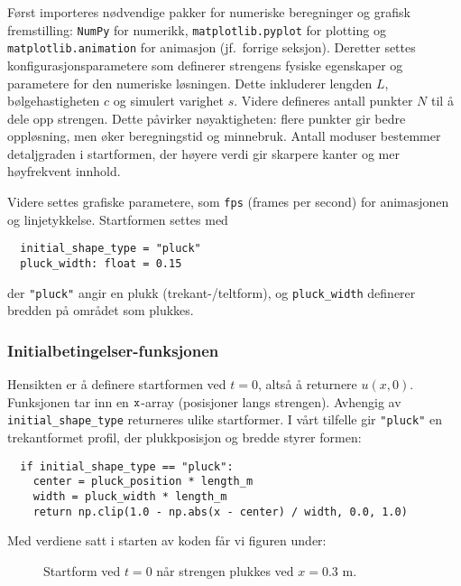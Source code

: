 Først importeres nødvendige pakker for numeriske beregninger og grafisk fremstilling: \texttt{NumPy} for numerikk,
\texttt{matplotlib.pyplot} for plotting og \texttt{matplotlib.animation} for animasjon (jf.\ forrige seksjon).
Deretter settes konfigurasjonsparametere som definerer strengens fysiske egenskaper og parametere for den numeriske 
løsningen. Dette inkluderer lengden $L$, bølgehastigheten $c$ og simulert varighet $s$. Videre defineres antall
punkter $N$ til å dele opp strengen. Dette påvirker nøyaktigheten: flere punkter gir bedre oppløsning, men øker
beregningstid og minnebruk. Antall moduser bestemmer detaljgraden i startformen, der høyere verdi gir skarpere kanter og
mer høyfrekvent innhold. 

Videre settes grafiske parametere, som \texttt{fps} (frames per second) for animasjonen og linjetykkelse. Startformen 
settes med
\begin{lstlisting}
  initial_shape_type = "pluck"
  pluck_width: float = 0.15
\end{lstlisting}
der \verb|"pluck"| angir en plukk (trekant-/teltform), og \verb|pluck_width| definerer bredden på området som plukkes.

\subsubsection{Initialbetingelser-funksjonen}
Hensikten er å definere startformen ved $t=0$, altså å returnere $u(x,0)$.
Funksjonen tar inn en $\verb|x|$-array (posisjoner langs strengen). Avhengig av \verb|initial_shape_type|
returneres ulike startformer. I vårt tilfelle gir \verb|"pluck"| en trekantformet profil, der plukkposisjon og bredde styrer formen:
\begin{lstlisting}
  if initial_shape_type == "pluck":
    center = pluck_position * length_m
    width = pluck_width * length_m
    return np.clip(1.0 - np.abs(x - center) / width, 0.0, 1.0)
\end{lstlisting}

Med verdiene satt i starten av koden får vi figuren under:

\begin{figure}[H]
    \centering
    \caption{Startform ved $t=0$ når strengen plukkes ved $x=0.3$ m.}
\end{figure}

